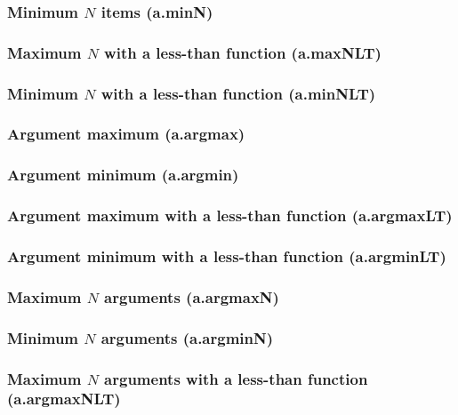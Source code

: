 \documentclass{article}
\theoremstyle{definition}
\begin{document}
\subsubsection{Minimum $N$ items (a.minN)}

\subsubsection{Maximum $N$ with a less-than function (a.maxNLT)}

\subsubsection{Minimum $N$ with a less-than function (a.minNLT)}

\subsubsection{Argument maximum (a.argmax)}

\subsubsection{Argument minimum (a.argmin)}

\subsubsection{Argument maximum with a less-than function (a.argmaxLT)}

\subsubsection{Argument minimum with a less-than function (a.argminLT)}

\subsubsection{Maximum $N$ arguments (a.argmaxN)}

\subsubsection{Minimum $N$ arguments (a.argminN)}

\subsubsection{Maximum $N$ arguments with a less-than function (a.argmaxNLT)}
\end{document}
